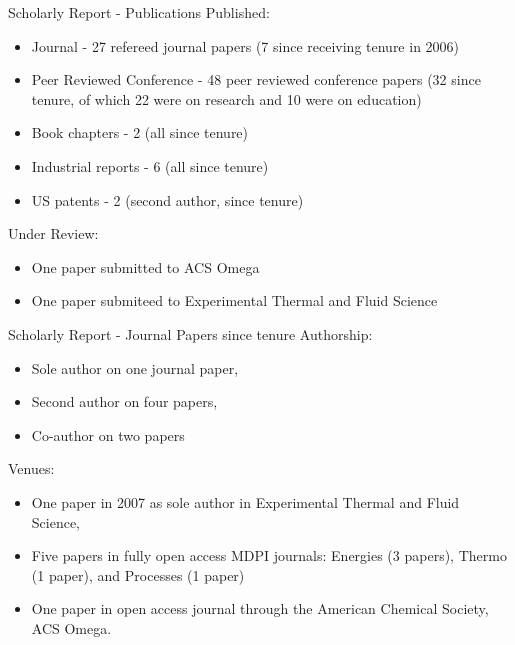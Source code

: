 \documentclass{beamer}
\begin{document}
\begin{frame}{Scholarly Report - Publications}
Published:
\begin{itemize}
  \item Journal - 27 refereed journal papers (7 since receiving tenure in 2006)
  \item Peer Reviewed Conference - 48 peer reviewed conference papers (32 since tenure, 
  	of which 22 were on research and 10 were on education)
  \item Book chapters - 2 (all since tenure)
  \item Industrial reports - 6  (all since tenure)
  \item US patents - 2 (second author, since tenure)
\end{itemize}
Under Review:
\begin{itemize}
  \item One paper submitted to ACS Omega
  \item One paper submiteed to Experimental Thermal and Fluid Science
\end{itemize}
\end{frame}

\begin{frame}{Scholarly Report - Journal Papers since tenure}
Authorship: 
\begin{itemize}
  \item Sole author on one journal paper, 
  \item Second author on four papers, 
  \item Co-author on two papers 
\end{itemize}

Venues: 
\begin{itemize}
  \item One paper in 2007 as sole author in Experimental Thermal and Fluid Science,
  \item  Five papers in  fully open access MDPI journals: Energies (3 papers), 
  	Thermo (1 paper), and Processes (1 paper) 
  \item One paper in  open access journal through the American Chemical Society, ACS Omega. 
\end{itemize}
\end{frame}
\end{document}
